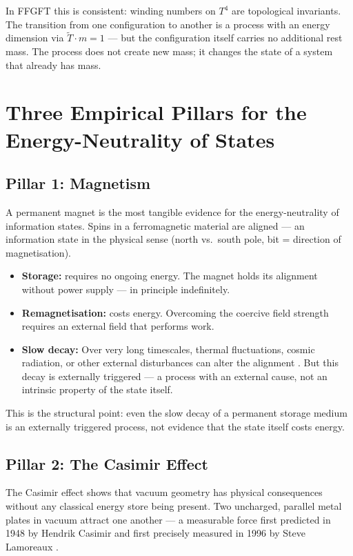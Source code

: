 In FFGFT this is consistent: winding numbers on $T^4$ are topological
invariants. The transition from one configuration to another is a process
with an energy dimension via $\tilde{T}\cdot m=1$ — but the configuration
itself carries no additional rest mass. The process does not create new
mass; it changes the state of a system that already has mass.

\section{Three Empirical Pillars for the Energy-Neutrality of States}

\subsection{Pillar 1: Magnetism}

A permanent magnet is the most tangible evidence for the energy-neutrality
of information states. Spins in a ferromagnetic material are aligned —
an information state in the physical sense (north vs.\ south pole, bit =
direction of magnetisation).

\begin{itemize}
  \item \textbf{Storage:} requires no ongoing energy. The magnet holds
        its alignment without power supply — in principle indefinitely.
  \item \textbf{Remagnetisation:} costs energy. Overcoming the coercive
        field strength requires an external field that performs work.
  \item \textbf{Slow decay:} Over very long timescales, thermal
        fluctuations, cosmic radiation, or other external disturbances
        can alter the alignment \cite{Nattermann1990}. But this decay
        is externally triggered — a process with an external cause,
        not an intrinsic property of the state itself.
\end{itemize}

This is the structural point: even the slow decay of a permanent storage
medium is an externally triggered process, not evidence that the state
itself costs energy.

\subsection{Pillar 2: The Casimir Effect}

The Casimir effect shows that vacuum geometry has physical consequences
without any classical energy store being present. Two uncharged, parallel
metal plates in vacuum attract one another — a measurable force first
predicted in 1948 by Hendrik Casimir \cite{Casimir1948} and first
precisely measured in 1996 by Steve Lamoreaux \cite{Lamoreaux1997}.

